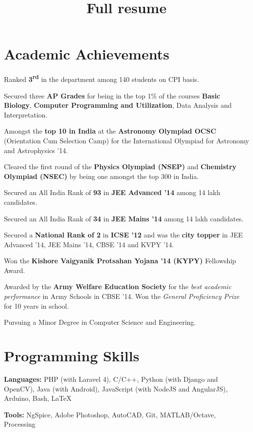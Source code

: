 \documentclass[11pt]{resume}
\title{Full resume}
\begin{document}
\vspace*{20mm}
\vspace{-2em}
\begin{resume}
\section{\mysidestyle Academic Achievements}
\begin{list2}
\item Ranked \textbf {3\textsuperscript{rd}} in the department among 140 students on CPI basis.
\item Secured three \textbf {AP Grades} for being in the top 1\% of the courses \textbf{Basic Biology}, \textbf{Computer Programming and Utilization}, Data Analysis and Interpretation.
\item Amongst the \textbf{top 10 in India} at the \textbf {Astronomy Olympiad OCSC} (Orientation Cum Selection Camp) for the International Olympiad for Astronomy and Astrophysics '14.
\item Cleared the first round of the \textbf{Physics Olympiad (NSEP)} and \textbf{Chemistry Olympiad (NSEC)} by being one amongst the top 300 in India.
\item Secured an All India Rank of \textbf{93} in \textbf{JEE Advanced '14} among 14 lakh candidates.
\item Secured an All India Rank of \textbf{34} in \textbf{JEE Mains '14} among 14 lakh candidates.
\item Secured a \textbf{National Rank of 2} in \textbf{ICSE '12} and was the \textbf{city topper} in  JEE Advanced '14, JEE Mains '14, CBSE '14 and KVPY '14.
\item Won the \textbf {Kishore Vaigyanik Protsahan Yojana '14 (KYPY)} Fellowship Award.
\item Awarded by the \textbf {Army Welfare Education Society} for the \textit{best academic performance} in Army Schools in CBSE '14. Won the \textit{General Proficiency Prize} for 10 years in school.
\item Pursuing a Minor Degree in Computer Science and Engineering. 
\end{list2}

\section{\mysidestyle Programming Skills}
\begin{list2}
\item \textbf{Languages:} PHP (with Laravel 4), C/C++, Python (with Django and OpenCV), Java (with Android), JavaScript (with NodeJS and AngularJS), Arduino, Bash, \LaTeX
\item \textbf{Tools:} NgSpice, Adobe Photoshop, AutoCAD, Git, MATLAB/Octave, Processing
\end{list2}

\end{resume}
\end{document}

